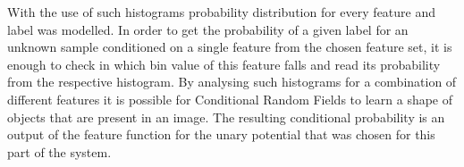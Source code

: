 With the use of such histograms probability distribution for every feature and label was modelled. In order to get the probability of a given label for an unknown sample conditioned on a single feature from the chosen feature set, it is enough to check in which bin value of this feature falls and read its probability from the respective histogram. By analysing such histograms for a combination of different features it is possible for Conditional Random Fields to learn a shape of objects that are present in an image. The resulting conditional probability is an output of the feature function for the unary potential that was chosen for this part of the system.